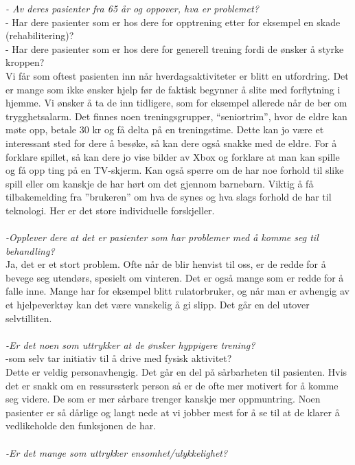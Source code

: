 \emph{- Av deres pasienter fra 65 år og oppover, hva er problemet? }\\
- Har dere pasienter som er hos dere for opptrening etter for eksempel en skade (rehabilitering)?\\
- Har dere pasienter som er hos dere for generell trening fordi de ønsker å styrke kroppen?\\
Vi får som oftest pasienten inn når hverdagsaktiviteter er blitt en utfordring. Det er mange som ikke ønsker hjelp før de faktisk begynner å slite med forflytning i hjemme. Vi ønsker å ta de inn tidligere, som for eksempel allerede når de ber om trygghetsalarm. Det finnes noen treningsgrupper, “seniortrim”, hvor de eldre kan møte opp, betale 30 kr og få delta på en treningstime. Dette kan jo være et interessant sted for dere å besøke, så kan dere også snakke med de eldre.  For å forklare spillet, så kan dere jo vise bilder av Xbox og forklare at man kan spille og få opp ting på en TV-skjerm. Kan også spørre om de har noe forhold til slike spill eller om kanskje de har hørt om det gjennom barnebarn. Viktig å få tilbakemelding fra ”brukeren” om hva de synes og hva slags forhold de har til teknologi. Her er det store individuelle forskjeller.\\ \\
\emph{-Opplever dere at det er pasienter som har problemer med å komme seg til behandling?}\\
Ja, det er et stort problem. Ofte når de blir henvist til oss, er de redde for å bevege seg utendørs, spesielt om vinteren. Det er også mange som er redde for å falle inne. Mange har for eksempel blitt rulatorbruker, og når man er avhengig av et hjelpeverktøy kan det være vanskelig å gi slipp. Det går en del utover selvtilliten. \\ \\
\emph{-Er det noen som uttrykker at de ønsker hyppigere trening?}\\
-som selv tar initiativ til å drive med fysisk aktivitet?\\
Dette er veldig personavhengig. Det går en del på sårbarheten til pasienten. Hvis det er snakk om en ressurssterk person så er de ofte mer motivert for å komme seg videre. De som er mer sårbare trenger kanskje mer oppmuntring. Noen pasienter er så dårlige og langt nede at vi jobber mest for å se til at de klarer å vedlikeholde den funksjonen de har.\\ \\
\emph{-Er det mange som uttrykker ensomhet/ulykkelighet?}\\
